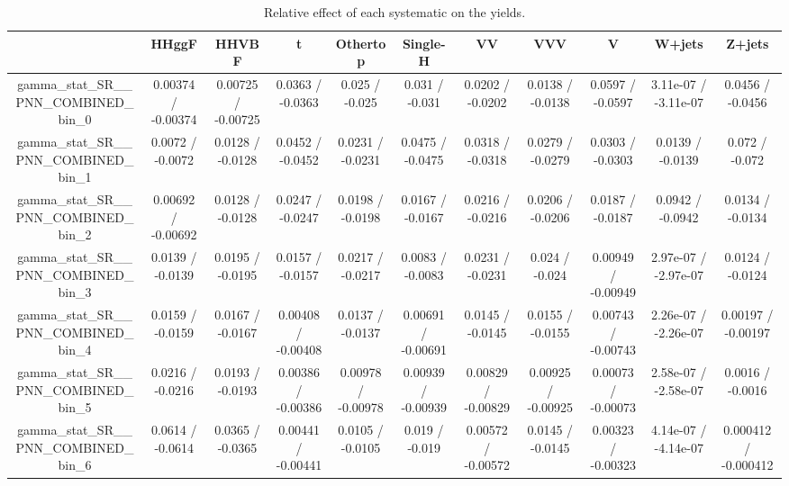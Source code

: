 \documentclass[10pt]{article}
\begin{document}
\begin{table}[htbp]
\begin{center}
\begin{tabular}{|c|c|c|c|c|c|c|c|c|c|c|}
\hline 
      & HHggF      & HHVBF      & t      & Othertop      & Single-H      & VV      & VVV      & V      & W+jets      & Z+jets \\ 
\hline 
  gamma_stat_SR__PNN_COMBINED_bin_0 & 0.00374 / -0.00374 & 0.00725 / -0.00725 & 0.0363 / -0.0363 & 0.025 / -0.025 & 0.031 / -0.031 & 0.0202 / -0.0202 & 0.0138 / -0.0138 & 0.0597 / -0.0597 & 3.11e-07 / -3.11e-07 & 0.0456 / -0.0456 \\ 
  gamma_stat_SR__PNN_COMBINED_bin_1 & 0.0072 / -0.0072 & 0.0128 / -0.0128 & 0.0452 / -0.0452 & 0.0231 / -0.0231 & 0.0475 / -0.0475 & 0.0318 / -0.0318 & 0.0279 / -0.0279 & 0.0303 / -0.0303 & 0.0139 / -0.0139 & 0.072 / -0.072 \\ 
  gamma_stat_SR__PNN_COMBINED_bin_2 & 0.00692 / -0.00692 & 0.0128 / -0.0128 & 0.0247 / -0.0247 & 0.0198 / -0.0198 & 0.0167 / -0.0167 & 0.0216 / -0.0216 & 0.0206 / -0.0206 & 0.0187 / -0.0187 & 0.0942 / -0.0942 & 0.0134 / -0.0134 \\ 
  gamma_stat_SR__PNN_COMBINED_bin_3 & 0.0139 / -0.0139 & 0.0195 / -0.0195 & 0.0157 / -0.0157 & 0.0217 / -0.0217 & 0.0083 / -0.0083 & 0.0231 / -0.0231 & 0.024 / -0.024 & 0.00949 / -0.00949 & 2.97e-07 / -2.97e-07 & 0.0124 / -0.0124 \\ 
  gamma_stat_SR__PNN_COMBINED_bin_4 & 0.0159 / -0.0159 & 0.0167 / -0.0167 & 0.00408 / -0.00408 & 0.0137 / -0.0137 & 0.00691 / -0.00691 & 0.0145 / -0.0145 & 0.0155 / -0.0155 & 0.00743 / -0.00743 & 2.26e-07 / -2.26e-07 & 0.00197 / -0.00197 \\ 
  gamma_stat_SR__PNN_COMBINED_bin_5 & 0.0216 / -0.0216 & 0.0193 / -0.0193 & 0.00386 / -0.00386 & 0.00978 / -0.00978 & 0.00939 / -0.00939 & 0.00829 / -0.00829 & 0.00925 / -0.00925 & 0.00073 / -0.00073 & 2.58e-07 / -2.58e-07 & 0.0016 / -0.0016 \\ 
  gamma_stat_SR__PNN_COMBINED_bin_6 & 0.0614 / -0.0614 & 0.0365 / -0.0365 & 0.00441 / -0.00441 & 0.0105 / -0.0105 & 0.019 / -0.019 & 0.00572 / -0.00572 & 0.0145 / -0.0145 & 0.00323 / -0.00323 & 4.14e-07 / -4.14e-07 & 0.000412 / -0.000412 \\ 
\hline 
\end{tabular} 
\caption{Relative effect of each systematic on the yields.} 
\end{center} 
\end{table} 
\end{document}
